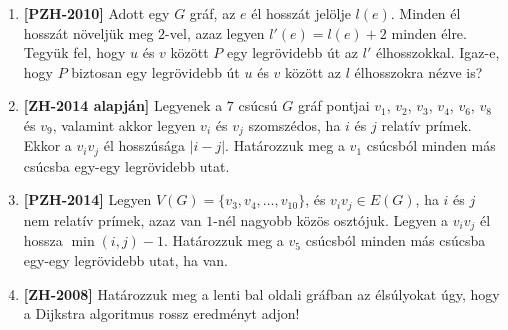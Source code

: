 \documentclass[a4paper,12pt]{article}
\begin{document}
\begin{enumerate}
        
        


        \item \textbf{[PZH-2010]} Adott egy $G$ gráf, az $e$ él hosszát jelölje $l(e)$. Minden él hosszát növeljük meg $2$-vel, azaz legyen $l'(e)=l(e)+2$ minden élre. Tegyük fel, hogy $u$ és $v$ között $P$ egy legrövidebb út az $l'$ élhosszokkal. Igaz-e, hogy $P$ biztosan egy legrövidebb út $u$ és $v$ között az $l$ élhosszokra nézve is?
        
        \item \textbf{[ZH-2014 alapján]} Legyenek a $7$ csúcsú $G$ gráf pontjai $v_1$, $v_2$, $v_3$, $v_4$, $v_6$, $v_8$ és $v_9$, valamint akkor legyen $v_i$ és $v_j$ szomszédos, ha $i$ és $j$ relatív prímek. Ekkor a $v_iv_j$ él hosszúsága $|i-j|$. Határozzuk meg a $v_1$ csúcsból minden más csúcsba egy-egy legrövidebb utat.
        
        \item \textbf{[PZH-2014]} Legyen $V(G) = \{v_3, v_4, \ldots, v_{10}\}$, és $v_iv_j \in E(G)$, ha $i$ és $j$ nem relatív prímek, azaz van $1$-nél nagyobb közös osztójuk. Legyen a $v_iv_j$ él hossza $\min(i,j) - 1$. Határozzuk meg a $v_5$ csúcsból minden más csúcsba egy-egy legrövidebb utat, ha van. 
        
        \item \textbf{[ZH-2008]} Határozzuk meg a lenti bal oldali gráfban az élsúlyokat úgy, hogy a Dijkstra algoritmus rossz eredményt adjon!
        \begin{figure}[h]
            \centering
            \begin{subfigure}{0.4\textwidth}
                \centering
                
            \end{subfigure}
        \end{figure}


\end{enumerate}
\end{document}
